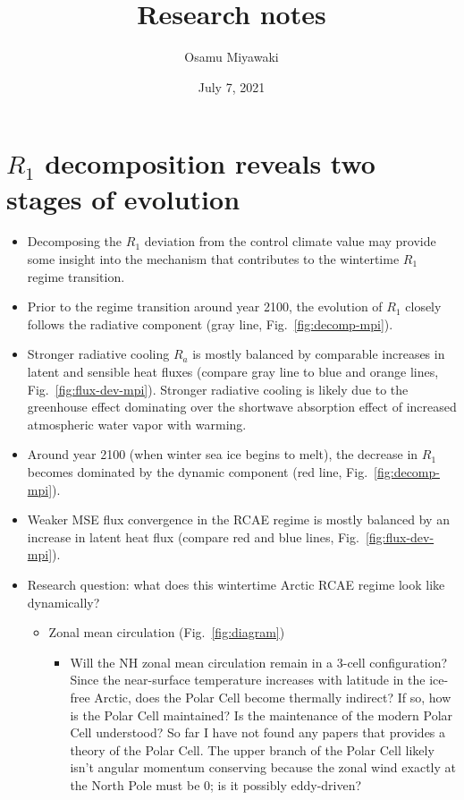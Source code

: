 \documentclass{article}
\title{Research notes}
\date{July 7, 2021}
\author{Osamu Miyawaki}
\begin{document}
\maketitle

\section{$R_1$ decomposition reveals two stages of evolution}
\begin{itemize}
    \item Decomposing the $R_1$ deviation from the control climate value may provide some insight into the mechanism that contributes to the wintertime $R_1$ regime transition.
    \item Prior to the regime transition around year 2100, the evolution of $R_1$ closely follows the radiative component (gray line, Fig.~\ref{fig:decomp-mpi}).
    \item Stronger radiative cooling $R_a$ is mostly balanced by comparable increases in latent and sensible heat fluxes (compare gray line to blue and orange lines, Fig.~\ref{fig:flux-dev-mpi}). Stronger radiative cooling is likely due to the greenhouse effect dominating over the shortwave absorption effect of increased atmospheric water vapor with warming.
    \item Around year 2100 (when winter sea ice begins to melt), the decrease in $R_1$ becomes dominated by the dynamic component (red line, Fig.~\ref{fig:decomp-mpi}).
    \item Weaker MSE flux convergence in the RCAE regime is mostly balanced by an increase in latent heat flux (compare red and blue lines, Fig.~\ref{fig:flux-dev-mpi}).
    \item Research question: what does this wintertime Arctic RCAE regime look like dynamically?
        \begin{itemize}
            \item Zonal mean circulation (Fig.~\ref{fig:diagram})
            \begin{itemize}
                \item Will the NH zonal mean circulation remain in a 3-cell configuration? Since the near-surface temperature increases with latitude in the ice-free Arctic, does the Polar Cell become thermally indirect? If so, how is the Polar Cell maintained? Is the maintenance of the modern Polar Cell understood? So far I have not found any papers that provides a theory of the Polar Cell. The upper branch of the Polar Cell likely isn't angular momentum conserving because the zonal wind exactly at the North Pole must be 0; is it possibly eddy-driven?

\end{itemize}
\end{itemize}
\end{itemize}
\end{document}
